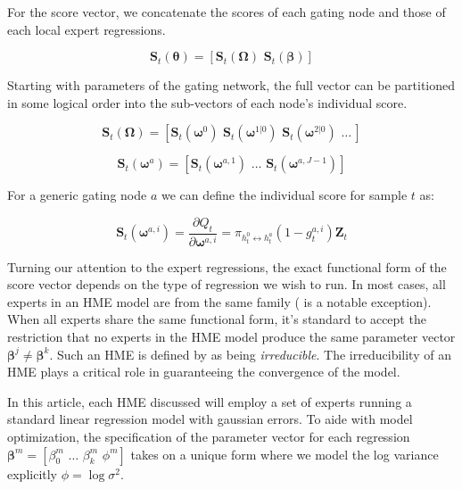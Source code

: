 \documentclass[12pt]{article}
\newcommand{\gateprod}[2]{\pi_{#1 \longleftrightarrow #2}}
\begin{document}
For the score vector, we concatenate the scores of each gating node and those of each
local expert regressions.

\begin{equation}
  \boldsymbol{S}_{t}(\boldsymbol{\theta}) = [ \boldsymbol{S}_{t}(\boldsymbol{\Omega}) \,\, \boldsymbol{S}_{t}(\boldsymbol{\beta}) ]
\end{equation}

Starting with parameters of the gating network, the full vector can be partitioned 
in some logical order into the sub-vectors of each node's individual
score.

\begin{equation}
  \boldsymbol{S}_{t}(\boldsymbol{\Omega}) = [ \boldsymbol{S}_{t}(\boldsymbol{\omega}^{0}) \,\, \boldsymbol{S}_{t}(\boldsymbol{\omega}^{1 | 0}) \,\, \boldsymbol{S}_{t}(\boldsymbol{\omega}^{2 | 0}) \,\, \ldots \, ]
\end{equation}

\begin{equation}
  \boldsymbol{S}_{t}(\boldsymbol{\omega}^{a}) = [ \boldsymbol{S}_{t}(\boldsymbol{\omega}^{a, 1}) \,\, \ldots \,\, \boldsymbol{S}_{t}(\boldsymbol{\omega}^{a, J - 1}) ]
\end{equation}

For a generic gating node $a$ we can define the individual score for 
sample $t$ as:

\begin{equation} \label{eq:gateScore}
  \boldsymbol{S}_{t}(\boldsymbol{\omega}^{a, i}) = \frac{\partial Q_{t}}{\partial \boldsymbol{\omega}^{a,i}} = \gateprod{h^{0}_{t}}{h^{a}_{t}} (1 - g^{a, i}_{t}) \boldsymbol{Z}_{t} 
\end{equation}




Turning our attention to the expert regressions, the exact functional form
of the score vector depends on the type of regression we wish to run. In most
cases, all experts in an HME model are from the same family
(\cite{HuertaJiangTanner2003} is a notable exception). When all experts share
the same functional form, it's standard to accept the restriction that no experts
in the HME model produce the same parameter vector
$\boldsymbol{\beta}^{j} \neq \boldsymbol{\beta}^{k}$. Such an HME is defined by
\cite{JiangTanner2000} as being \textit{irreducible}. The irreducibility of an HME
plays a critical role in guaranteeing the convergence of the model.

In this article, each HME discussed will employ a set of experts running 
a standard linear regression model with gaussian errors. To aide with model optimization,
the specification of the parameter vector for each regression
 $\boldsymbol{\beta}^{m} = [\beta_{0}^{m} \,\, \ldots \,\, \beta_{k}^m \,\, \phi^{m}]$
takes on a unique form where we model the log variance explicitly
$\phi = \log \sigma^{2}$.
\end{document}
